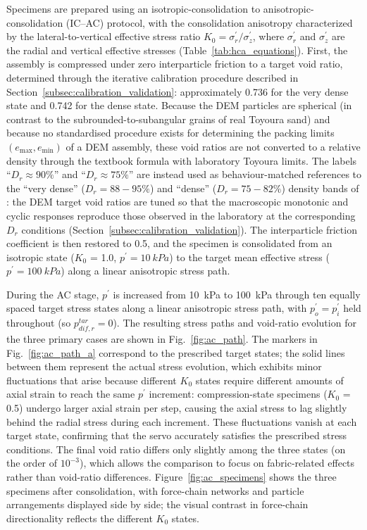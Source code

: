 \documentclass[a4paper,fleqn]{cas-sc}
\newcommand{\Kzero}{\ensuremath{K_0}}
\newcommand{\pmean}{\ensuremath{p^\prime}}
\begin{document}
Specimens are prepared using an isotropic-consolidation to anisotropic-consolidation (IC--AC) protocol, with the consolidation anisotropy characterized by the lateral-to-vertical effective stress ratio $\Kzero = \sigma_r^{\prime}/\sigma_z^{\prime}$, where $\sigma_r^{\prime}$ and $\sigma_z^{\prime}$ are the radial and vertical effective stresses (Table~\ref{tab:hca_equations}). First, the assembly is compressed under zero interparticle friction to a target void ratio, determined through the iterative calibration procedure described in Section~\ref{subsec:calibration_validation}: approximately 0.736 for the very dense state and 0.742 for the dense state. Because the DEM particles are spherical (in contrast to the subrounded-to-subangular grains of real Toyoura sand) and because no standardised procedure exists for determining the packing limits $(e_{\max}, e_{\min})$ of a DEM assembly, these void ratios are not converted to a relative density through the textbook formula with laboratory Toyoura limits. The labels ``$D_r \approx 90\%$'' and ``$D_r \approx 75\%$'' are instead used as behaviour-matched references to the ``very dense'' ($D_r = 88\!-\!95\%$) and ``dense'' ($D_r = 75\!-\!82\%$) density bands of \citet{Ishihara1985}: the DEM target void ratios are tuned so that the macroscopic monotonic and cyclic responses reproduce those observed in the laboratory at the corresponding $D_r$ conditions (Section~\ref{subsec:calibration_validation}). The interparticle friction coefficient is then restored to 0.5, and the specimen is consolidated from an isotropic state (\Kzero{} = 1.0, $\pmean=\SI{10}{kPa}$) to the target mean effective stress ($\pmean=\SI{100}{kPa}$) along a linear anisotropic stress path.

During the AC stage, $\pmean$ is increased from \SI{10}{kPa} to \SI{100}{kPa} through ten equally spaced target stress states along a linear anisotropic stress path, with $p_o^{\prime}=p_i^{\prime}$ held throughout (so $p_{dif,r}^{tar}=0$). The resulting stress paths and void-ratio evolution for the three primary cases are shown in Fig.~\ref{fig:ac_path}. The markers in Fig.~\ref{fig:ac_path_a} correspond to the prescribed target states; the solid lines between them represent the actual stress evolution, which exhibits minor fluctuations that arise because different \Kzero{} states require different amounts of axial strain to reach the same $\pmean$ increment: compression-state specimens (\Kzero{} = 0.5) undergo larger axial strain per step, causing the axial stress to lag slightly behind the radial stress during each increment. These fluctuations vanish at each target state, confirming that the servo accurately satisfies the prescribed stress conditions. The final void ratio differs only slightly among the three states (on the order of $10^{-3}$), which allows the comparison to focus on fabric-related effects rather than void-ratio differences. Figure~\ref{fig:ac_specimens} shows the three specimens after consolidation, with force-chain networks and particle arrangements displayed side by side; the visual contrast in force-chain directionality reflects the different \Kzero{} states.
\end{document}
